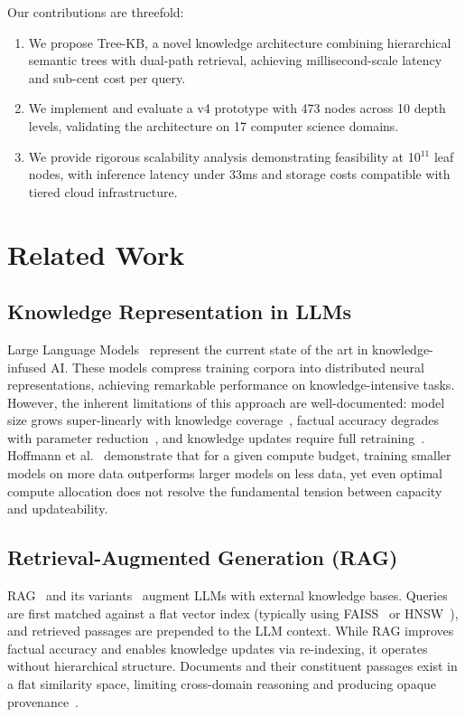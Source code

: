 \documentclass[11pt,a4paper]{article}
\begin{document}
Our contributions are threefold:
\begin{enumerate}
    \item We propose Tree-KB, a novel knowledge architecture combining hierarchical semantic trees with dual-path retrieval, achieving millisecond-scale latency and sub-cent cost per query.
    \item We implement and evaluate a v4 prototype with 473 nodes across 10 depth levels, validating the architecture on 17 computer science domains.
    \item We provide rigorous scalability analysis demonstrating feasibility at 10$^{11}$ leaf nodes, with inference latency under 33ms and storage costs compatible with tiered cloud infrastructure.
\end{enumerate}

\section{Related Work}
\label{sec:related}

\subsection{Knowledge Representation in LLMs}

Large Language Models~\cite{brown2020language,devlin2019bert} represent the current state of the art in knowledge-infused AI. These models compress training corpora into distributed neural representations, achieving remarkable performance on knowledge-intensive tasks. However, the inherent limitations of this approach are well-documented: model size grows super-linearly with knowledge coverage~\cite{kaplan2020scaling}, factual accuracy degrades with parameter reduction~\cite{petroni2019language}, and knowledge updates require full retraining~\cite{jang2022knowledge}. Hoffmann et al.~\cite{hoffmann2022training} demonstrate that for a given compute budget, training smaller models on more data outperforms larger models on less data, yet even optimal compute allocation does not resolve the fundamental tension between capacity and updateability.

\subsection{Retrieval-Augmented Generation (RAG)}

RAG~\cite{lewis2020retrieval} and its variants~\cite{izacard2022few,shao2023enhancing} augment LLMs with external knowledge bases. Queries are first matched against a flat vector index (typically using FAISS~\cite{johnson2019billion-scale} or HNSW~\cite{malkov2018efficient}), and retrieved passages are prepended to the LLM context. While RAG improves factual accuracy and enables knowledge updates via re-indexing, it operates without hierarchical structure. Documents and their constituent passages exist in a flat similarity space, limiting cross-domain reasoning and producing opaque provenance~\cite{gao2023retrieval}.
\end{document}

